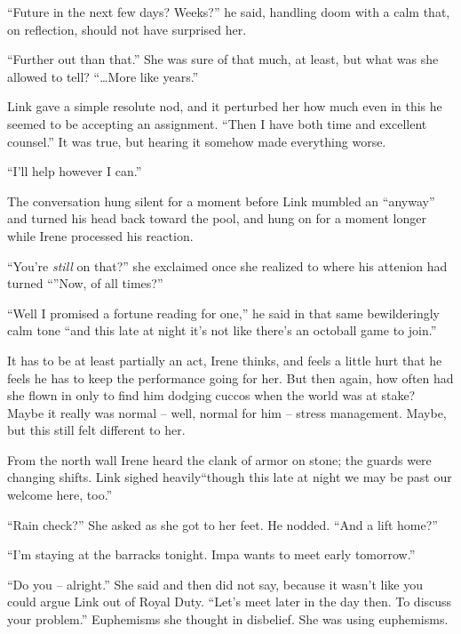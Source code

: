 \documentclass[../FGP.tex]{subfiles}
\begin{document}
\begin{fragment}
``Future in the next few days? Weeks?'' he said, handling doom with a calm that, on reflection, should not have surprised her.

``Further out than that.'' She was sure of that much, at least, but what was she allowed to tell? ``\ldots More like years.''

Link gave a simple resolute nod, and it perturbed her how much even in this he seemed to be accepting an assignment. 
``Then I have both time and excellent counsel.'' 
It was true, but hearing it somehow made everything worse. 

``I'll help however I can.''

The conversation hung silent for a moment before Link mumbled an ``anyway'' and turned his head back toward the pool, and hung on for a moment longer while Irene processed his reaction. 

``You're \emph{still} on that?'' she exclaimed once she realized to where his attenion had turned ``''Now, of all times?'' 

``Well I promised a fortune reading for one,'' he said in that same bewilderingly calm tone ``and this late at night it's not like there's an octoball game to join.''

It has to be at least partially an act, Irene thinks, and feels a little hurt that he feels he has to keep the performance going for her. But then again, how often had she flown in only to find him dodging cuccos when the world was at stake? Maybe it really was normal -- well, normal for him -- stress management. Maybe, but this still felt different to her.

From the north wall Irene heard the clank of armor on stone; the guards were changing shifts. Link sighed heavily``though this late at night we may be past our welcome here, too.''

``Rain check?'' She asked as she got to her feet. He nodded. ``And a lift home?''

``I'm staying at the barracks tonight. Impa wants to meet early tomorrow.''

``Do you -- alright.'' She said and then did not say, because it wasn't like you could argue Link out of Royal Duty. ``Let's meet later in the day then. To discuss your problem.'' Euphemisms she thought in disbelief. She was using euphemisms. 


\end{fragment}
\end{document}
